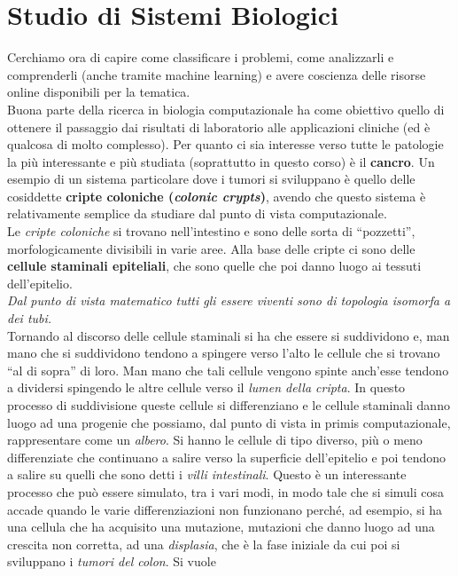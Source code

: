 \documentclass[a4paper,12pt, oneside]{book}
\begin{document}
\chapter{Studio di Sistemi Biologici}
Cerchiamo ora di capire come classificare i problemi, come analizzarli e
comprenderli (anche tramite machine learning) e avere coscienza delle risorse
online disponibili per la tematica.\\
Buona parte della ricerca in biologia computazionale ha come obiettivo quello di
ottenere il passaggio dai risultati di laboratorio alle applicazioni cliniche
(ed è qualcosa di molto complesso). Per quanto ci sia interesse verso tutte le
patologie la più interessante e più studiata (soprattutto in questo corso) è il
\textbf{cancro}. Un esempio di un sistema particolare dove i tumori si
sviluppano è quello delle cosiddette \textbf{cripte coloniche (\textit{colonic
    crypts})}, avendo che questo sistema è relativamente semplice da studiare
dal punto di vista computazionale.\\
Le \textit{cripte coloniche} si trovano nell'intestino e sono delle sorta di
``pozzetti'', morfologicamente divisibili in varie aree.
Alla base delle cripte ci sono delle \textbf{cellule staminali epiteliali}, che
sono quelle che poi danno luogo ai tessuti dell'epitelio.\\
\textit{Dal punto di vista matematico tutti gli essere viventi sono di topologia
isomorfa a dei tubi.}\\
Tornando al discorso delle cellule staminali si ha che essere si suddividono e,
man mano che si suddividono tendono a spingere verso l'alto le cellule che si
trovano ``al di sopra'' di loro. Man mano che tali cellule vengono spinte
anch'esse tendono a dividersi spingendo le altre cellule verso il \textit{lumen
  della cripta}. In questo processo di suddivisione queste cellule si
differenziano e le cellule staminali danno luogo ad una progenie che possiamo,
dal punto di vista in primis computazionale, rappresentare come un
\textit{albero}. Si hanno le cellule di tipo diverso, più o meno
differenziate che continuano a salire verso la superficie dell'epitelio e poi
tendono a salire su quelli che sono detti i \textit{villi intestinali}. Questo è
un interessante processo che può essere simulato, tra i vari modi, in modo tale
che si simuli cosa accade quando le varie differenziazioni non funzionano
perché, ad esempio, si ha una cellula che ha acquisito una mutazione, mutazioni
che danno luogo ad una crescita non corretta, ad una \textit{displasia}, che è
la fase iniziale da cui poi si sviluppano i \textit{tumori del colon}. Si vuole
\end{document}
